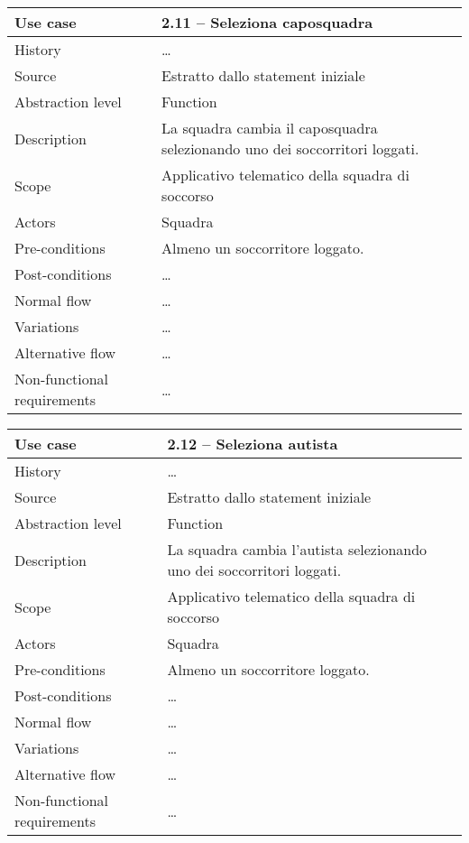 \documentclass{article}
\begin{document}
    \begin{table}
        \begin{tabularx}{\textwidth}{l|X}
            Use case & 2.11 – Seleziona caposquadra\\
            \hline
            History & \dots \\
            Source & Estratto dallo statement iniziale\\
            Abstraction level & Function\\
            Description & La squadra cambia il caposquadra selezionando uno dei soccorritori loggati.\\
            Scope & Applicativo telematico della squadra di soccorso\\
            Actors & Squadra\\
            Pre-conditions & Almeno un soccorritore loggato. \\
            Post-conditions & \dots \\
            Normal flow & \dots \\
            Variations & \dots \\
            Alternative flow & \dots \\
            Non-functional requirements & \dots
        \end{tabularx}
        \label{tab:usecase2.11}
    \end{table}

    \begin{table}
        \begin{tabularx}{\textwidth}{l|X}
            Use case & 2.12 – Seleziona autista\\
            \hline
            History & \dots \\
            Source & Estratto dallo statement iniziale\\
            Abstraction level & Function\\
            Description & La squadra cambia l’autista selezionando uno dei soccorritori loggati.\\
            Scope & Applicativo telematico della squadra di soccorso\\
            Actors & Squadra\\
            Pre-conditions & Almeno un soccorritore loggato. \\
            Post-conditions & \dots \\
            Normal flow & \dots \\
            Variations & \dots \\
            Alternative flow & \dots \\
            Non-functional requirements & \dots
        \end{tabularx}
        \label{tab:usecase2.12}
    \end{table}
\end{document}
